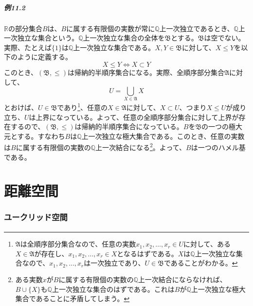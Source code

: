 \documentclass{jsarticle}
\begin{document}
\subsubsection{例11.2}
$\mathbb{R}$の部分集合$B$は、$B$に属する有限個の実数が常に$\mathbb{Q}$上一次独立であるとき、$\mathbb{Q}$上一次独立な集合という。$\mathbb{Q}$上一次独立な集合の全体を$\mathfrak{B}$とする。$\mathfrak{B}$は空でない。実際、たとえば$\{1\}$は$\mathbb{Q}$上一次独立な集合である。$X,Y\in\mathfrak{B}$に対して、$X\leq Y$を以下のように定義する。
\[X\leq Y\Longleftrightarrow X\subset Y\]
このとき、$(\mathfrak{B},\leq)$は帰納的半順序集合になる。実際、全順序部分集合$\mathfrak{A}$に対して、
\[U=\bigcup_{X\in\mathfrak{A}}X\]
とおけば、$U\in\mathfrak{B}$であり\footnote{$\mathfrak{A}$は全順序部分集合なので、任意の実数$x_1,x_2,\dots,x_r\in U$に対して、ある$X\in\mathfrak{A}$が存在し、$x_1,x_2,\dots,x_r\in X$となるはずである。$X$は$\mathbb{Q}$上一次独立な集合なので、$x_1,x_2,\dots,x_r$は一次独立であり、$U\in\mathfrak{B}$であることがわかる。}、任意の$X\in\mathfrak{A}$に対して、$X\subset U$、つまり$X\leq U$が成り立ち、$U$は上界になっている。よって、任意の全順序部分集合に対して上界が存在するので、$(\mathfrak{B},\leq)$は帰納的半順序集合になっている。$B$を$\mathfrak{B}$の一つの極大元とする。すなわち$B$は$\mathbb{Q}$上一次独立な極大集合である。このとき、任意の実数は$B$に属する有限個の実数の$\mathbb{Q}$上一次結合になる\footnote{ある実数$x$が$B$に属する有限個の実数の$\mathbb{Q}$上一次結合にならなければ、$B\cup\{X\}$も$\mathbb{Q}$上一次独立な集合のはずである。これは$B$が$\mathbb{Q}$上一次独立な極大集合であることに矛盾してしまう。}。よって、$B$は一つのハメル基である。






\part{距離空間}
\section{ユークリッド空間}


\subsection{}
\end{document}
